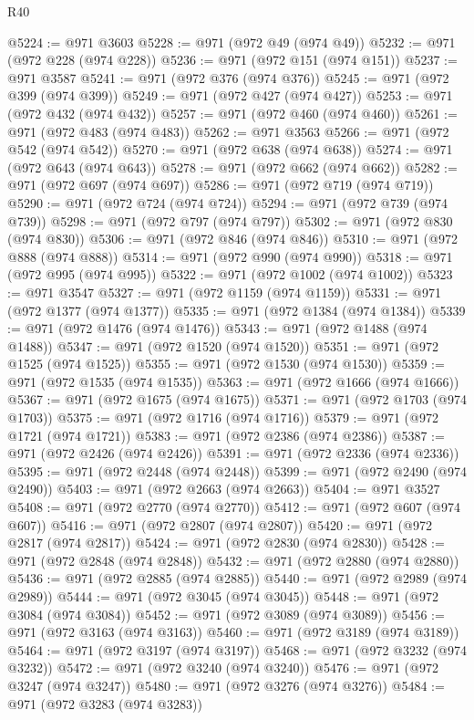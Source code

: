 \begin{lexlean}{R40}
\begin{coremodule}
@5224 := @971 @3603
@5228 := @971 (@972 @49 (@974 @49))
@5232 := @971 (@972 @228 (@974 @228))
@5236 := @971 (@972 @151 (@974 @151))
@5237 := @971 @3587
@5241 := @971 (@972 @376 (@974 @376))
@5245 := @971 (@972 @399 (@974 @399))
@5249 := @971 (@972 @427 (@974 @427))
@5253 := @971 (@972 @432 (@974 @432))
@5257 := @971 (@972 @460 (@974 @460))
@5261 := @971 (@972 @483 (@974 @483))
@5262 := @971 @3563
@5266 := @971 (@972 @542 (@974 @542))
@5270 := @971 (@972 @638 (@974 @638))
@5274 := @971 (@972 @643 (@974 @643))
@5278 := @971 (@972 @662 (@974 @662))
@5282 := @971 (@972 @697 (@974 @697))
@5286 := @971 (@972 @719 (@974 @719))
@5290 := @971 (@972 @724 (@974 @724))
@5294 := @971 (@972 @739 (@974 @739))
@5298 := @971 (@972 @797 (@974 @797))
@5302 := @971 (@972 @830 (@974 @830))
@5306 := @971 (@972 @846 (@974 @846))
@5310 := @971 (@972 @888 (@974 @888))
@5314 := @971 (@972 @990 (@974 @990))
@5318 := @971 (@972 @995 (@974 @995))
@5322 := @971 (@972 @1002 (@974 @1002))
@5323 := @971 @3547
@5327 := @971 (@972 @1159 (@974 @1159))
@5331 := @971 (@972 @1377 (@974 @1377))
@5335 := @971 (@972 @1384 (@974 @1384))
@5339 := @971 (@972 @1476 (@974 @1476))
@5343 := @971 (@972 @1488 (@974 @1488))
@5347 := @971 (@972 @1520 (@974 @1520))
@5351 := @971 (@972 @1525 (@974 @1525))
@5355 := @971 (@972 @1530 (@974 @1530))
@5359 := @971 (@972 @1535 (@974 @1535))
@5363 := @971 (@972 @1666 (@974 @1666))
@5367 := @971 (@972 @1675 (@974 @1675))
@5371 := @971 (@972 @1703 (@974 @1703))
@5375 := @971 (@972 @1716 (@974 @1716))
@5379 := @971 (@972 @1721 (@974 @1721))
@5383 := @971 (@972 @2386 (@974 @2386))
@5387 := @971 (@972 @2426 (@974 @2426))
@5391 := @971 (@972 @2336 (@974 @2336))
@5395 := @971 (@972 @2448 (@974 @2448))
@5399 := @971 (@972 @2490 (@974 @2490))
@5403 := @971 (@972 @2663 (@974 @2663))
@5404 := @971 @3527
@5408 := @971 (@972 @2770 (@974 @2770))
@5412 := @971 (@972 @607 (@974 @607))
@5416 := @971 (@972 @2807 (@974 @2807))
@5420 := @971 (@972 @2817 (@974 @2817))
@5424 := @971 (@972 @2830 (@974 @2830))
@5428 := @971 (@972 @2848 (@974 @2848))
@5432 := @971 (@972 @2880 (@974 @2880))
@5436 := @971 (@972 @2885 (@974 @2885))
@5440 := @971 (@972 @2989 (@974 @2989))
@5444 := @971 (@972 @3045 (@974 @3045))
@5448 := @971 (@972 @3084 (@974 @3084))
@5452 := @971 (@972 @3089 (@974 @3089))
@5456 := @971 (@972 @3163 (@974 @3163))
@5460 := @971 (@972 @3189 (@974 @3189))
@5464 := @971 (@972 @3197 (@974 @3197))
@5468 := @971 (@972 @3232 (@974 @3232))
@5472 := @971 (@972 @3240 (@974 @3240))
@5476 := @971 (@972 @3247 (@974 @3247))
@5480 := @971 (@972 @3276 (@974 @3276))
@5484 := @971 (@972 @3283 (@974 @3283))

\end{coremodule}
\end{lexlean}
